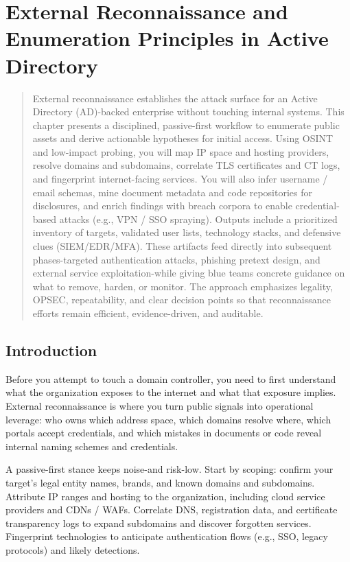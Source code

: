 \chapter{External Reconnaissance and Enumeration Principles in Active Directory}

\begin{abstract}
    External reconnaissance establishes the attack surface for an Active Directory (AD)-backed enterprise without touching internal systems. This chapter presents a disciplined, passive-first workflow to enumerate public assets and derive actionable hypotheses for initial access. Using OSINT and low-impact probing, you will map IP space and hosting providers, resolve domains and subdomains, correlate TLS certificates and CT logs, and fingerprint internet-facing services. You will also infer username / email schemas, mine document metadata and code repositories for disclosures, and enrich findings with breach corpora to enable credential-based attacks (e.g., VPN / SSO spraying). Outputs include a prioritized inventory of targets, validated user lists, technology stacks, and defensive clues (SIEM/EDR/MFA). These artifacts feed directly into subsequent phases-targeted authentication attacks, phishing pretext design, and external service exploitation-while giving blue teams concrete guidance on what to remove, harden, or monitor. The approach emphasizes legality, OPSEC, repeatability, and clear decision points so that reconnaissance efforts remain efficient, evidence-driven, and auditable.
\end{abstract}
\section{Introduction}
Before you attempt to touch a domain controller, you need to first understand what the organization exposes to the internet and what that exposure implies. External reconnaissance is where you turn public signals into operational leverage: who owns which address space, which domains resolve where, which portals accept credentials, and which mistakes in documents or code reveal internal naming schemes and credentials.

A passive-first stance keeps noise-and risk-low. Start by scoping: confirm your target's legal entity names, brands, and known domains and subdomains. Attribute IP ranges and hosting to the organization, including cloud service providers and CDNs / WAFs. Correlate DNS, registration data, and certificate transparency logs to expand subdomains and discover forgotten services. Fingerprint technologies to anticipate authentication flows (e.g., SSO, legacy protocols) and likely detections.

